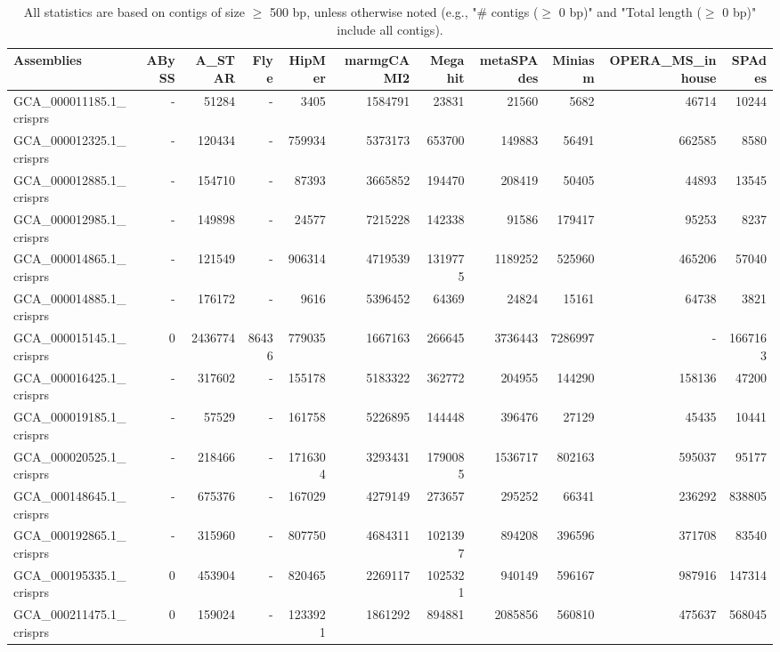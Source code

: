 \documentclass[12pt,a4paper]{article}
\begin{document}
\begin{table}[ht]
\begin{center}
\caption{All statistics are based on contigs of size $\geq$ 500 bp, unless otherwise noted (e.g., "\# contigs ($\geq$ 0 bp)" and "Total length ($\geq$ 0 bp)" include all contigs).}
\begin{tabular}{|l*{10}{|r}|}
\hline
Assemblies & ABySS & A\_STAR & Flye & HipMer & marmgCAMI2 & Megahit & metaSPAdes & Miniasm & OPERA\_MS\_inhouse & SPAdes \\ \hline
GCA\_000011185.1\_crisprs & - & 51284 & - & 3405 & 1584791 & 23831 & 21560 & 5682 & 46714 & 10244 \\ \hline
GCA\_000012325.1\_crisprs & - & 120434 & - & 759934 & 5373173 & 653700 & 149883 & 56491 & 662585 & 8580 \\ \hline
GCA\_000012885.1\_crisprs & - & 154710 & - & 87393 & 3665852 & 194470 & 208419 & 50405 & 44893 & 13545 \\ \hline
GCA\_000012985.1\_crisprs & - & 149898 & - & 24577 & 7215228 & 142338 & 91586 & 179417 & 95253 & 8237 \\ \hline
GCA\_000014865.1\_crisprs & - & 121549 & - & 906314 & 4719539 & 1319775 & 1189252 & 525960 & 465206 & 57040 \\ \hline
GCA\_000014885.1\_crisprs & - & 176172 & - & 9616 & 5396452 & 64369 & 24824 & 15161 & 64738 & 3821 \\ \hline
GCA\_000015145.1\_crisprs & 0 & 2436774 & 86436 & 779035 & 1667163 & 266645 & 3736443 & 7286997 & - & 1667163 \\ \hline
GCA\_000016425.1\_crisprs & - & 317602 & - & 155178 & 5183322 & 362772 & 204955 & 144290 & 158136 & 47200 \\ \hline
GCA\_000019185.1\_crisprs & - & 57529 & - & 161758 & 5226895 & 144448 & 396476 & 27129 & 45435 & 10441 \\ \hline
GCA\_000020525.1\_crisprs & - & 218466 & - & 1716304 & 3293431 & 1790085 & 1536717 & 802163 & 595037 & 95177 \\ \hline
GCA\_000148645.1\_crisprs & - & 675376 & - & 167029 & 4279149 & 273657 & 295252 & 66341 & 236292 & 838805 \\ \hline
GCA\_000192865.1\_crisprs & - & 315960 & - & 807750 & 4684311 & 1021397 & 894208 & 396596 & 371708 & 83540 \\ \hline
GCA\_000195335.1\_crisprs & 0 & 453904 & - & 820465 & 2269117 & 1025321 & 940149 & 596167 & 987916 & 147314 \\ \hline
GCA\_000211475.1\_crisprs & 0 & 159024 & - & 1233921 & 1861292 & 894881 & 2085856 & 560810 & 475637 & 568045 \\ \hline

\end{tabular}
\end{center}
\end{table}
\end{document}
